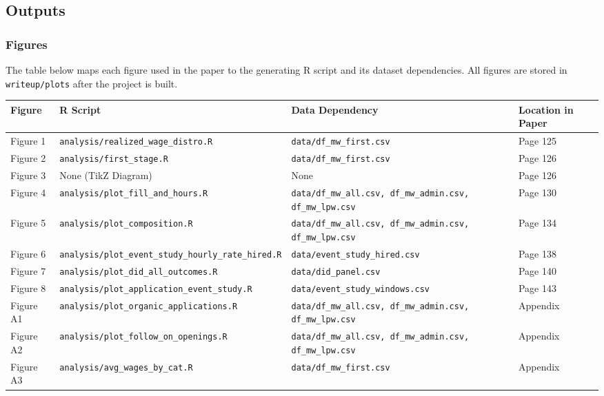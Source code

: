 \documentclass[10pt]{article}
\newenvironment{eightpt}{\begingroup\fontsize{8}{12.5}\selectfont}{\endgroup}
\begin{document}
\subsection{Outputs}

\subsubsection{Figures}
The table below maps each figure used in the paper to the generating R script and its dataset dependencies. All figures are stored in \texttt{writeup/plots} after the project is built.

\begin{eightpt}
\begin{tabularx}{\textwidth}{@{}p{}p{}p{}>{\centering\arraybackslash}p{}@{}}
\toprule
Figure & R Script & Data Dependency & Location in Paper \\
\midrule
Figure 1 & \texttt{analysis/realized\_wage\_distro.R} & \texttt{data/df\_mw\_first.csv} & Page 125 \\
Figure 2 & \texttt{analysis/first\_stage.R} & \texttt{data/df\_mw\_first.csv} & Page 126 \\
Figure 3 & None (TikZ Diagram) & None & Page 126 \\
Figure 4 & \texttt{analysis/plot\_fill\_and\_hours.R} & \texttt{data/df\_mw\_all.csv, df\_mw\_admin.csv, df\_mw\_lpw.csv} & Page 130 \\
Figure 5 & \texttt{analysis/plot\_composition.R} & \texttt{data/df\_mw\_all.csv, df\_mw\_admin.csv, df\_mw\_lpw.csv} & Page 134 \\
Figure 6 & \texttt{analysis/plot\_event\_study\_hourly\_rate\_hired.R} & \texttt{data/event\_study\_hired.csv} & Page 138 \\
Figure 7 & \texttt{analysis/plot\_did\_all\_outcomes.R} & \texttt{data/did\_panel.csv} & Page 140 \\
Figure 8 & \texttt{analysis/plot\_application\_event\_study.R} & \texttt{data/event\_study\_windows.csv} & Page 143 \\
Figure A1 & \texttt{analysis/plot\_organic\_applications.R} & \texttt{data/df\_mw\_all.csv, df\_mw\_admin.csv, df\_mw\_lpw.csv} & Appendix \\
Figure A2 & \texttt{analysis/plot\_follow\_on\_openings.R} & \texttt{data/df\_mw\_all.csv, df\_mw\_admin.csv, df\_mw\_lpw.csv} & Appendix \\
Figure A3 & \texttt{analysis/avg\_wages\_by\_cat.R} & \texttt{data/df\_mw\_first.csv} & Appendix \\

\end{tabularx}
\end{eightpt}
\end{document}
